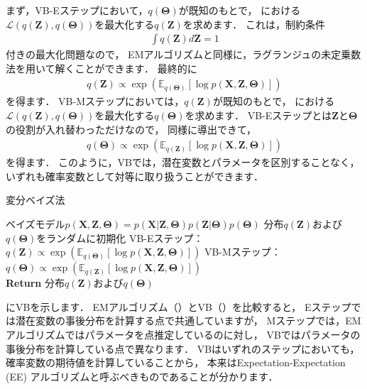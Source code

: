 まず，VB-Eステップにおいて，$q(\bm\Theta)$が既知のもとで，
における
$\mathcal{L}(q(\bm{Z}),q(\bm\Theta))$を最大化する$q(\bm{Z})$を求めます．
これは，制約条件
\begin{align}
\int q(\bm{Z}) d\bm{Z} = 1
\end{align}
付きの最大化問題なので，
EMアルゴリズムと同様に，ラグランジュの未定乗数法を用いて解くことができます．
最終的に
\begin{align}
q(\bm{Z}) 
\propto \exp\left(\mathbb{E}_{q(\bm\Theta)}[\log p(\bm{X},\bm{Z},\bm\Theta)]\right)
\end{align}
を得ます．
VB-Mステップにおいては，$q(\bm{Z})$が既知のもとで，
における
$\mathcal{L}(q(\bm{Z}),q(\bm\Theta))$を最大化する$q(\bm\Theta)$を求めます．
VB-Eステップとは$\bm{Z}$と$\bm\Theta$の役割が入れ替わっただけなので，
同様に導出できて，
\begin{align}
q(\bm\Theta) 
\propto \exp\left(\mathbb{E}_{q(\bm{Z})}[\log p(\bm{X},\bm{Z},\bm\Theta)]\right)
\end{align}
を得ます．
このように，VBでは，潜在変数とパラメータを区別することなく，
いずれも確率変数として対等に取り扱うことができます．

\begin{algobox}{変分ベイズ法}
\label{algo:vb}
\begin{algorithmic}[1]
\Require ベイズモデル$p(\bm{X},\bm{Z},\bm\Theta) = p(\bm{X}|\bm{Z},\bm\Theta) p(\bm{Z} | \bm\Theta) p(\bm\Theta)$
\State 分布$q(\bm{Z})$および$q(\bm\Theta)$をランダムに初期化
\State VB-Eステップ：$q(\bm{Z}) \propto \exp\left(\mathbb{E}_{q(\bm\Theta)}[\log p(\bm{X},\bm{Z},\bm\Theta)]\right)$
\State VB-Mステップ：$q(\bm\Theta) \propto \exp\left(\mathbb{E}_{q(\bm{Z})}[\log p(\bm{X},\bm{Z},\bm\Theta)]\right)$
\EndWhile\\
{\bf Return} 分布$q(\bm{Z})$および$q(\bm\Theta)$
\end{algorithmic}
\end{algobox}

\newpage

にVBを示します．
EMアルゴリズム（）とVB（）を比較すると，
Eステップでは潜在変数の事後分布を計算する点で共通していますが，
Mステップでは，EMアルゴリズムではパラメータを点推定しているのに対し，
VBではパラメータの事後分布を計算している点で異なります．
VBはいずれのステップにおいても，確率変数の期待値を計算していることから，
本来はExpectation-Expectation (EE) アルゴリズムと呼ぶべきものであることが分かります．

